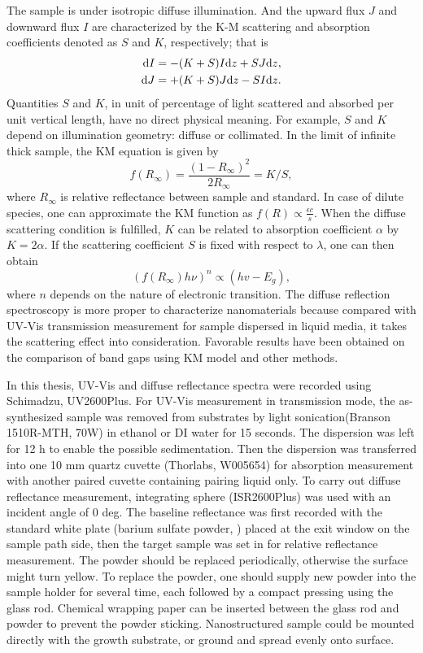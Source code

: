 The sample is under isotropic diffuse illumination. And the upward flux $J$ and downward flux $I$ are characterized by the K-M scattering and absorption coefficients denoted as $S$ and $K$, respectively; that is
\begin{align}
\mathrm{d} I &= - (K + S)I \mathrm{d} z + SJ\mathrm{d} z,\\
\mathrm{d} J &= + (K + S)J \mathrm{d} z - SI\mathrm{d} z.
\end{align}
Quantities $S$ and $K$, in unit of percentage of light scattered and absorbed per unit vertical length, have no direct physical meaning. For example, $S$ and $K$ depend on illumination geometry: diffuse or collimated. In the limit of infinite thick sample, the KM equation is given by
\begin{equation}
f(R_\infty) = \frac{(1-R_\infty)^2}{2R_\infty} = K/S,
\end{equation}
where $R_\infty$ is relative reflectance between sample and standard. In case of dilute species, one can approximate the KM function as $f(R) \propto \frac{\epsilon c}{s}$. When the diffuse scattering condition is fulfilled, $K$ can be related to absorption coefficient $\alpha$ by $K = 2\alpha$. If the scattering coefficient $S$ is fixed with respect to $\lambda$, one can then obtain
\begin{equation}
(f(R_\infty) h \nu)^n \propto (hv - E_g),
\end{equation}
where $n$ depends on the nature of electronic transition. The diffuse reflection spectroscopy is more proper to characterize nanomaterials because compared with UV-Vis transmission measurement for sample dispersed in liquid media, it takes the scattering effect into consideration. Favorable results have been obtained on the comparison of band gaps using KM model and other methods.\cite{Tandon1970,Morales2007} 

In this thesis, UV-Vis and diffuse reflectance spectra were recorded using Schimadzu, UV2600Plus. For UV-Vis measurement in transmission mode, the as-synthesized sample was removed from substrates by light sonication(Branson 1510R-MTH, 70W) in ethanol or DI water for 15 seconds. The dispersion was left for 12 h to enable the possible sedimentation. Then the dispersion was transferred into one 10 mm quartz cuvette (Thorlabs, W005654) for absorption measurement with another paired cuvette containing pairing liquid only. To carry out diffuse reflectance measurement, integrating sphere (ISR2600Plus) was used with an incident angle of 0 deg. The baseline reflectance was first recorded with the standard white plate (barium sulfate powder, ) placed at the exit window on the sample path side, then the target sample was set in for relative reflectance measurement. The  powder should be replaced periodically, otherwise the surface might turn yellow. To replace the  powder, one should supply new powder into the sample holder for several time, each followed by a compact pressing using the glass rod. Chemical wrapping paper can be inserted between the glass rod and  powder to prevent the powder sticking. Nanostructured sample could be mounted directly with the growth substrate, or ground and spread evenly onto  surface.

